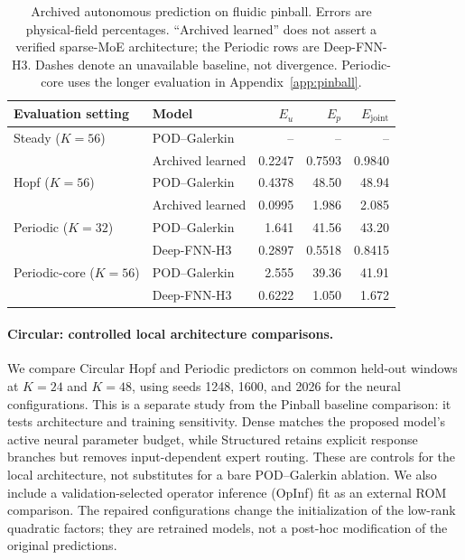 \begin{table}[H]
\centering
\caption{
Archived autonomous prediction on fluidic pinball. Errors are
physical-field percentages. ``Archived learned'' does not assert a
verified sparse-MoE architecture; the Periodic rows are Deep-FNN-H3.
Dashes denote an unavailable baseline, not divergence.
Periodic-core uses the longer evaluation in Appendix~\ref{app:pinball}.
}
\label{tab:pinball_autonomous}
\small
\setlength{\tabcolsep}{5pt}
\begin{tabular}{@{}llrrr@{}}
\toprule
Evaluation setting & Model & $E_u$ & $E_p$ & $E_{\mathrm{joint}}$ \\
\midrule
Steady ($K=56$)
& POD--Galerkin
& -- & -- & -- \\
& Archived learned
& 0.2247 & 0.7593 & 0.9840 \\
\addlinespace

Hopf ($K=56$)
& POD--Galerkin
& 0.4378 & 48.50 & 48.94 \\
& Archived learned
& 0.0995 & 1.986 & 2.085 \\
\addlinespace

Periodic ($K=32$)
& POD--Galerkin
& 1.641 & 41.56 & 43.20 \\
& Deep-FNN-H3
& 0.2897 & 0.5518 & 0.8415 \\
\addlinespace

Periodic-core ($K=56$)
& POD--Galerkin
& 2.555 & 39.36 & 41.91 \\
& Deep-FNN-H3
& 0.6222 & 1.050 & 1.672 \\
\bottomrule
\end{tabular}
\end{table}

\paragraph{Circular: controlled local architecture comparisons.}
We compare Circular Hopf and Periodic predictors on common held-out
windows at $K=24$ and $K=48$, using seeds 1248, 1600, and 2026 for
the neural configurations. This is a separate study from the Pinball
baseline comparison: it tests architecture and training sensitivity.
Dense matches the proposed model's active
neural parameter budget, while Structured retains explicit response
branches but removes input-dependent expert routing. These are
controls for the local architecture, not substitutes for a bare
POD--Galerkin ablation. We also include a validation-selected
operator inference (OpInf) fit as an external ROM comparison.
The repaired configurations change the initialization of the
low-rank quadratic factors; they are retrained models, not a
post-hoc modification of the original predictions.

